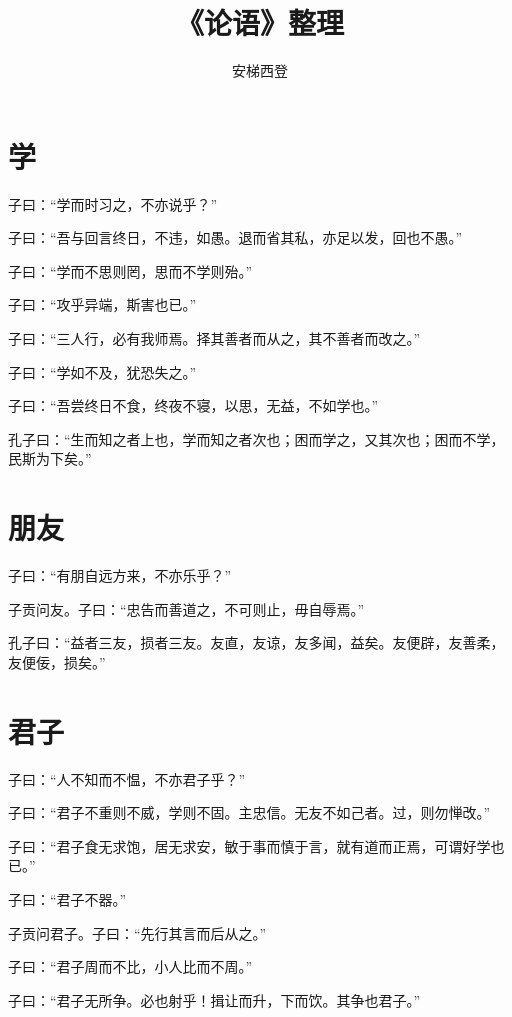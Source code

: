 \documentclass[a5paper]{ctexbook}
\title{《论语》整理}
\author{安梯西登}
\date{}
\begin{document}
    \maketitle

    \tableofcontents

    \chapter{学}

    子曰：“学而时习之，不亦说乎？”

    子曰：“吾与回言终日，不违，如愚。退而省其私，亦足以发，回也不愚。”

    子曰：“学而不思则罔，思而不学则殆。”

    子曰：“攻乎异端，斯害也已。”

    子曰：“三人行，必有我师焉。择其善者而从之，其不善者而改之。”

    子曰：“学如不及，犹恐失之。”

    子曰：“吾尝终日不食，终夜不寝，以思，无益，不如学也。”

    孔子曰：“生而知之者上也，学而知之者次也；困而学之，又其次也；困而不学，民斯为下矣。”

    \chapter{朋友}

    子曰：“有朋自远方来，不亦乐乎？”

    子贡问友。子曰：“忠告而善道之，不可则止，毋自辱焉。”

    孔子曰：“益者三友，损者三友。友直，友谅，友多闻，益矣。友便辟，友善柔，友便佞，损矣。”

    \chapter{君子}
    
    子曰：“人不知而不愠，不亦君子乎？”

    子曰：“君子不重则不威，学则不固。主忠信。无友不如己者。过，则勿惮改。”

    子曰：“君子食无求饱，居无求安，敏于事而慎于言，就有道而正焉，可谓好学也已。”

    子曰：“君子不器。”
    
    子贡问君子。子曰：“先行其言而后从之。”
    
    子曰：“君子周而不比，小人比而不周。”

    子曰：“君子无所争。必也射乎！揖让而升，下而饮。其争也君子。”
\end{document}
